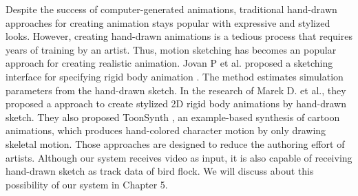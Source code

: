 Despite the success of computer-generated animations, traditional hand-drawn approaches for creating animation stays popular with  expressive and stylized looks. However, creating hand-drawn animations is a tedious process that requires years of training by an artist. Thus, motion sketching has becomes an popular approach for creating realistic animation. Jovan P et al. proposed a sketching interface for specifying rigid body animation \cite{MoSketch}. The method estimates simulation parameters from the hand-drawn sketch. In the research of Marek D. et al., they proposed a approach to create stylized 2D rigid body animations by hand-drawn sketch\cite{Rigid}. They also proposed ToonSynth \cite{ToonSynth}, an example-based synthesis of cartoon animations, which produces hand-colored  character motion by only drawing skeletal motion. Those approaches are designed to reduce the authoring effort of artists.  Although our system receives video as input, it is also capable of receiving hand-drawn sketch as track data of bird flock. We will discuss about this possibility of our system in Chapter 5.